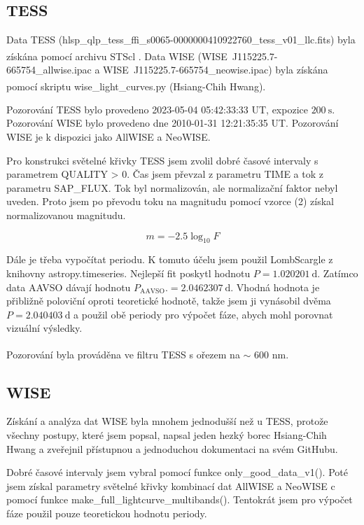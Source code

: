 \documentclass[a4paper,11pt,twocolumn]{article}
\begin{document}
        \subsection{TESS}
            Data TESS (hlsp\_qlp\_tess\_ffi\_s0065-0000000410922760\_tess\_v01\_llc.fits) byla získána pomocí archivu STScl \textsuperscript{\cite{stsci}}. Data WISE (WISE\ J115225.7-665754\_allwise.ipac a WISE\ J115225.7-665754\_neowise.ipac) byla získána pomocí skriptu wise\_light\_curves.py (Hsiang-Chih Hwang)\textsuperscript{\cite{wise}}. 

            Pozorování TESS bylo provedeno 2023-05-04 05:42:33:33 UT, expozice $\qty{200}{\second}$. Pozorování WISE bylo provedeno dne 2010-01-31 12:21:35:35 UT.  Pozorování WISE je k dispozici jako AllWISE a NeoWISE.

            Pro konstrukci světelné křivky TESS jsem zvolil dobré časové intervaly s parametrem QUALITY > 0. Čas jsem převzal z parametru TIME a tok z parametru SAP\_FLUX. Tok byl normalizován, ale normalizační faktor nebyl uveden. Proto jsem po převodu toku na magnitudu pomocí vzorce (2) získal normalizovanou magnitudu. 

            \begin{equation}
                m = -2.5 \log_{10} F
            \end{equation}

            Dále je třeba vypočítat periodu. K tomuto účelu jsem použil LombScargle z knihovny astropy.timeseries. Nejlepší fit poskytl hodnotu $P = 1.020201 ~\text{d}$. Zatímco data AAVSO dávají hodnotu $P_{\text{AAVSO}}. = 2.0462307 ~\text{d}$. Vhodná hodnota je přibližně poloviční oproti teoretické hodnotě, takže jsem ji vynásobil dvěma $P = 2.040403 ~\text{d}$ a použil obě periody pro výpočet fáze, abych mohl porovnat vizuální výsledky. 

            Pozorování byla prováděna ve filtru TESS s ořezem na $\sim$ 600 nm\textsuperscript{\cite{tess}}.
        
        \subsection{WISE}
            Získání a analýza dat WISE byla mnohem jednodušší než u TESS, protože všechny postupy, které jsem popsal, napsal jeden hezký borec Hsiang-Chih Hwang a zveřejnil přístupnou a jednoduchou dokumentaci na svém GitHubu. 

            Dobré časové intervaly jsem vybral pomocí funkce only\_good\_data\_v1(). Poté jsem získal parametry světelné křivky kombinací dat AllWISE a NeoWISE c pomocí funkce make\_full\_lightcurve\_multibands(). Tentokrát jsem pro výpočet fáze použil pouze teoretickou hodnotu periody. 
\end{document}

